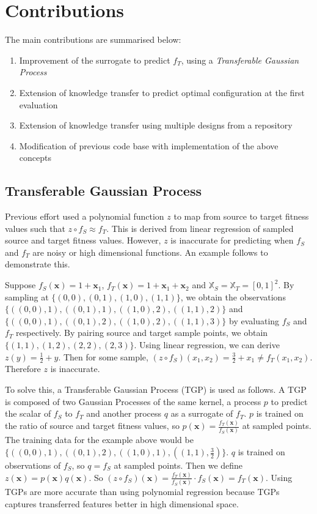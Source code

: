 \documentclass[10pt,a4paper]{article}
\begin{document}
\section{Contributions}

The main contributions are summarised below:
\begin{enumerate}
\item Improvement of the surrogate to predict $f_T$, using a \emph{Transferable Gaussian Process}
\item Extension of knowledge transfer to predict optimal configuration at the first evaluation
\item Extension of knowledge transfer using multiple designs from a repository
\item Modification of previous code base\cite{Nicholson2015} with implementation of the above concepts
\end{enumerate}
\subsection{Transferable Gaussian Process}

Previous effort\cite{Kurek2016} used a polynomial function $z$ to map from source to target fitness values such that $z\circ f_S\approx f_T$. This is derived from linear regression of sampled source and target fitness values. However, $z$ is inaccurate for predicting when $f_S$ and $f_T$ are noisy or high dimensional functions. An example follows to demonstrate this.

Suppose $f_S(\mathbf{x})=1+\mathbf{x}_1$, $f_T(\mathbf{x})=1+\mathbf{x}_1+\mathbf{x}_2$ and $\mathbb{X}_S=\mathbb{X}_T=[0,1]^2$. By sampling at $\{(0,0),(0,1),(1,0),(1,1)\}$, we obtain the observations $\{((0,0),1),\allowbreak((0,1),1),((1,0),2),((1,1),2)\}$ and $\{((0,0),1),((0,1),2),((1,0),2),((1,1),3)\}$ by evaluating $f_S$ and $f_T$ respectively. By pairing source and target sample points, we obtain $\{(1,1),(1,2),(2,2),(2,3)\}$. Using linear regression, we can derive $z(y)=\frac{1}{2}+y$. Then for some sample, $(z\circ f_S)(x_1,x_2)=\frac{3}{2}+x_1\not=f_T(x_1,x_2)$. Therefore $z$ is inaccurate.

To solve this, a Transferable Gaussian Process (TGP) is used as follows. A TGP is composed of two Gaussian Processes of the same kernel, a process $p$ to predict the scalar of $f_S$ to $f_T$ and another process $q$ as a surrogate of $f_T$. $p$ is trained on the ratio of source and target fitness values, so $p(\mathbf{x})=\frac{f_T(\mathbf{x})}{f_S(\mathbf{x})}$ at sampled points. The training data for the example above would be $\{((0,0),1),((0,1),2),((1,0),1),((1,1),\frac{3}{2})\}$. $q$ is trained on observations of $f_S$, so $q=f_S$ at sampled points. Then we define $z(\mathbf{x})=p(\mathbf{x})q(\mathbf{x})$. So $(z\circ f_S)(\mathbf{x})=\frac{f_T(\mathbf{x})}{f_S(\mathbf{x})}\cdot f_S(\mathbf{x})=f_T(\mathbf{x})$. Using TGPs are more accurate than using polynomial regression because TGPs captures transferred features better in high dimensional space.
\end{document}
